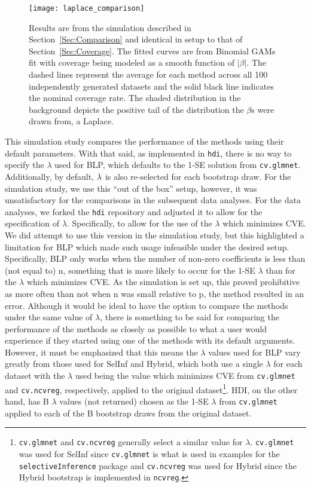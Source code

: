 \begin{figure}[hbtp]
  \begin{center}
  \texttt{[image: laplace\_comparison]}
  \caption{\label{Fig:laplace_comparison} Results are from the simulation described in Section~\ref{Sec:Comparison} and identical in setup to that of Section~\ref{Sec:Coverage}. The fitted curves are from Binomial GAMs fit with coverage being modeled as a smooth function of $|\beta|$. The dashed lines represent the average for each method across all 100 independently generated datasets and the solid black line indicates the nominal coverage rate. The shaded distribution in the background depicts the positive tail of the distribution the $\beta$s were drawn from, a Laplace.}
  \end{center}
\end{figure}

This simulation study compares the performance of the methods using their default parameters. With that said, as implemented in \texttt{hdi}, there is no way to specify the $\lambda$ used for BLP, which defaults to the 1-SE solution from \texttt{cv.glmnet}. Additionally, by default, $\lambda$ is also re-selected for each bootstrap draw. For the simulation study, we use this ``out of the box'' setup, however, it was unsatisfactory for the comparisons in the subsequent data analyses. For the data analyses, we forked the \texttt{hdi} repository and adjusted it to allow for the specification of $\lambda$. Specifically, to allow for the use of the $\lambda$ which minimizes CVE. We did attempt to use this version in the simulation study, but this highlighted a limitation for BLP which made such usage infeasible under the desired setup. Specifically, BLP only works when the number of non-zero coefficients is less than (not equal to) n, something that is more likely to occur for the 1-SE $\lambda$ than for the $\lambda$ which minimizes CVE. As the simulation is set up, this proved prohibitive as more often than not when n was small relative to p, the method resulted in an error. Although it would be ideal to have the option to compare the methods under the same value of $\lambda$, there is something to be said for comparing the performance of the methods as closely as possible to what a user would experience if they started using one of the methods with its default arguments. However, it must be emphasized that this means the $\lambda$ values used for BLP vary greatly from those used for SelInf and Hybrid, which both use a single $\lambda$ for each dataset with the $\lambda$ used being the value which minimizes CVE from \texttt{cv.glmnet} and \texttt{cv.ncvreg}, respectively, applied to the original dataset\footnote{\texttt{cv.glmnet} and \texttt{cv.ncvreg} generally select a similar value for $\lambda$. \texttt{cv.glmnet} was used for SelInf since \texttt{cv.glmnet} is what is used in examples for the \texttt{selectiveInference} package and \texttt{cv.ncvreg} was used for Hybrid since the Hybrid bootstrap is implemented in \texttt{ncvreg}.}. HDI, on the other hand, has B $\lambda$ values (not returned) chosen as the 1-SE $\lambda$ from \texttt{cv.glmnet} applied to each of the B bootstrap draws from the original dataset.

